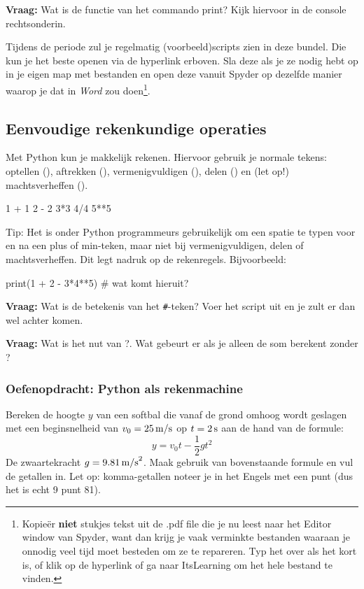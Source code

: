 \documentclass[a4paper,11pt, fleqn]{article}
\begin{document}
{\bf Vraag:} Wat is de functie van het commando print? Kijk hiervoor in de console rechtsonderin.

Tijdens de periode zul je regelmatig (voorbeeld)scripts zien in deze bundel. Die kun je het beste openen via de hyperlink erboven. 
Sla deze als je ze nodig hebt op in je eigen map met bestanden en open deze vanuit Spyder op dezelfde manier waarop je dat in \textit{Word} zou doen\footnote{Kopie\"{e}r \textbf{niet} stukjes tekst uit de .pdf file die je nu leest naar het Editor window van Spyder, want dan krijg je vaak verminkte bestanden waaraan je onnodig veel tijd moet besteden om ze te repareren. Typ het over als het kort is, of klik op de hyperlink of ga naar ItsLearning om het hele bestand te vinden.}.

\subsection{Eenvoudige rekenkundige operaties}
Met Python kun je makkelijk rekenen. Hiervoor gebruik je normale tekens: optellen (\pythoninline{+}), aftrekken (\pythoninline{-}), vermenigvuldigen (\pythoninline{*}), delen (\pythoninline{/}) en (let op!) machtsverheffen (\pythoninline{**}).

\begin{python}
1 + 1
2 - 2
3*3
4/4
5**5
\end{python}

Tip: Het is onder Python programmeurs gebruikelijk om een spatie te typen voor en na een plus of min-teken, maar niet bij vermenigvuldigen, delen of machtsverheffen. Dit legt nadruk op de rekenregels. Bijvoorbeeld: 

\begin{python}
print(1 + 2 - 3*4**5) # wat komt hieruit?
\end{python}
\textbf{Vraag:} Wat is de betekenis van het \verb,#,-teken? Voer het script uit en je zult er dan wel achter komen. 

\textbf{Vraag:} Wat is het nut van ?. Wat gebeurt er als je alleen de som berekent zonder ?
\subsubsection*{Oefenopdracht: Python als rekenmachine} Bereken de hoogte $y$ van een softbal die vanaf de grond omhoog wordt geslagen met een beginsnelheid van $v_0 = 25 \, {\rm m/s}$ op $t = 2 \, {\rm s}$ aan de hand van de formule:
\begin{equation}
y = v_0 t - \frac{1}{2}g t^2
\end{equation}
De zwaartekracht $g = 9.81 \, {\rm m/s}^2$. Maak gebruik van bovenstaande formule en vul de getallen in. Let op: komma-getallen noteer je in het Engels met een punt (dus het is echt 9 punt 81).
\end{document}
